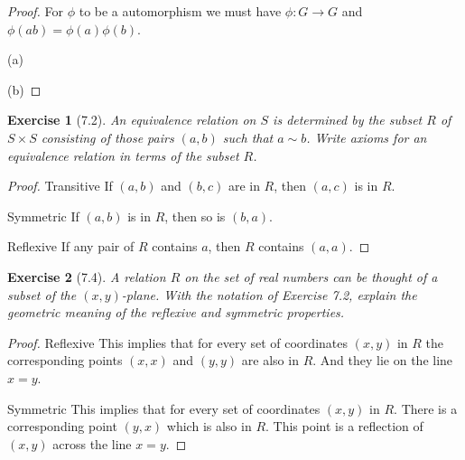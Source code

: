 \documentclass[12pt,leqno]{article}
\numberwithin{equation}{section}
\newtheorem*{exer}{Exercise}
\theoremstyle{definition}
\begin{document}
\begin{proof}[Proof]

    For $\phi$ to be a automorphism we must have $\phi : G \rightarrow G$ and $\phi(ab) = \phi(a) \phi(b)$.

\item[(a)]

\item[(b)]

\end{proof}


\begin{exer}[7.2]An equivalence relation on $S$ is determined by the subset $R$ of $S \times S$ consisting of those pairs $(a,b)$ such that $a \sim b$. Write axioms for an equivalence relation in terms of the subset $R$.

\end{exer}

\begin{proof}[Proof]

\item[Transitive] If $(a, b)$ and $(b, c)$ are in $R$, then $(a, c)$ is in $R$.

\item[Symmetric] If $(a, b)$ is in $R$, then so is $(b, a)$.

\item[Reflexive] If any pair of $R$ contains $a$, then $R$ contains $(a, a)$.

\end{proof}


\begin{exer}[7.4] 
A relation $R$ on the set of real numbers can be thought of a subset of the
$(x,y)$-plane. With the notation of Exercise 7.2, explain the geometric meaning
of the reflexive and symmetric properties.

\end{exer}

\begin{proof}[Proof]

\item[Reflexive] This implies that for every set of coordinates $(x, y)$ in $R$
    the corresponding points $(x, x)$ and $(y, y)$ are also in $R$. And they
    lie on the line $x = y$.

\item[Symmetric] This implies that for every set of coordinates $(x, y)$ in
    $R$. There is a corresponding point $(y, x)$ which is also in $R$. This
    point is a reflection of $(x, y)$ across the line $x = y$. 

\end{proof}
\end{document}
